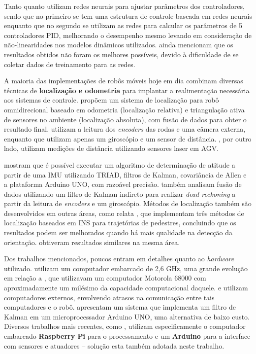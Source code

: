 Tanto \cite{treesatayapun2011discrete} quanto \cite{oubbati2005velocity} utilizam redes neurais para ajustar parâmetros dos controladores, sendo que no primeiro se tem uma estrutura de controle baseada em redes neurais enquanto que no segundo se utilizam as redes para calcular os parâmetros de 5 controladores PID, melhorando o desempenho mesmo levando em consideração de não-linearidades nos modelos dinâmicos utilizados. \cite{oubbati2005velocity} ainda mencionam que os resultados obtidos não foram os melhores possíveis, devido à dificuldade de se coletar dados de treinamento para as redes.

A maioria das implementações de robôs móveis hoje em dia combinam diversas técnicas de \textbf{localização e odometria} para implantar a realimentação necessária aos sistemas de controle. \cite{ginzburg2013indoor} propõem um sistema de localização para robô omnidirecional baseado em odometria (localização relativa) e triangulação ativa de sensores no ambiente (localização absoluta), com fusão de dados para obter o resultado final. \cite{rojas2006holonomic} utilizam a leitura dos \emph{encoders} das rodas e uma câmera externa, enquanto que \cite{garcia2015gyro} utilizam apenas um giroscópio e um sensor de distância. \cite{rohrig2010laser}, por outro lado, utilizam medições de distância utilizando sensores laser em AGV.

\cite{lowcostIMU} mostram que é possível executar um algoritmo de determinação de atitude a partir de uma IMU utilizando TRIAD, filtros de Kalman, covariância de Allen e a plataforma Arduino UNO, com razoável precisão. \cite{park1996dead} também analisam fusão de dados utilizando um filtro de Kalman indireto para realizar \emph{dead-reckoning} a partir da leitura de \emph{encoders} e um giroscópio. Métodos de localização também são desenvolvidos em outras áreas, como relata \cite{jimenez2009comparison}, que implementam três métodos de localização baseados em INS para trajetórias de pedestres, concluindo que os resultados podem ser melhorados quando há mais qualidade na detecção da orientação. \cite{steinhoff2010pocket} obtiveram resultados similares na mesma área.

Dos trabalhos mencionados, poucos entram em detalhes quanto ao \emph{hardware} utilizado. \cite{oubbati2005velocity} utilizam um computador embarcado de 2,6 GHz, uma grande evolução em relação a \cite{feng1989servo}, que utilizavam um computador Motorola 68000 com aproximadamente um milésimo da capacidade computacional daquele. \cite{takemura2007development} e \cite{loh2003mechatronics} utilizam computadores externos, envolvendo atrasos na comunicação entre tais computadores e o robô. \cite{lowcostIMU} apresentam um sistema que implementa um filtro de Kalman em um microprocessador Arduino UNO, uma alternativa de baixo custo. Diversos trabalhos mais recentes, como \cite{krinkin2015design}, utilizam especificamente o computador embarcado \textbf{Raspberry Pi} para o processamento e um \textbf{Arduino} para a interface com sensores e atuadores -- solução esta também adotada neste trabalho.
